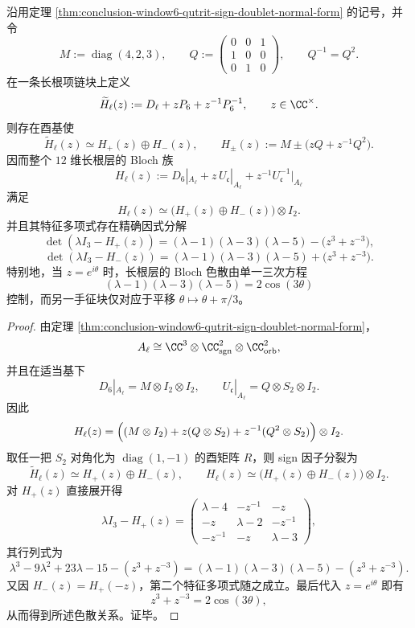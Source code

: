\begin{theorem}\label{thm:conclusion-window6-long-bloch-chiral-cubic}
沿用定理 \ref{thm:conclusion-window6-qutrit-sign-doublet-normal-form} 的记号，并令
\[
M:=\operatorname{diag}(4,2,3),\qquad
Q:=
\begin{pmatrix}
0&0&1\\
1&0&0\\
0&1&0
\end{pmatrix},
\qquad
Q^{-1}=Q^2.
\]
在一条长根项链块上定义
\[
\widetilde H_{\ell}(z):=D_{\ell}+zP_6+z^{-1}P_6^{-1},
\qquad z\in\CC^\times.
\]
则存在酉基使
\[
\widetilde H_{\ell}(z)\simeq H_+(z)\oplus H_-(z),
\qquad
H_\pm(z):=M\pm\bigl(zQ+z^{-1}Q^2\bigr).
\]
因而整个 \(12\) 维长根层的 Bloch 族
\[
H_{\ell}(z):=D_6|_{A_{\ell}}+z\,U_{\mathfrak c}|_{A_{\ell}}+z^{-1}U_{\mathfrak c}^{-1}|_{A_{\ell}}
\]
满足
\[
H_{\ell}(z)\simeq \bigl(H_+(z)\oplus H_-(z)\bigr)\otimes I_2.
\]
并且其特征多项式存在精确因式分解
\[
\det(\lambda I_3-H_+(z))
=(\lambda-1)(\lambda-3)(\lambda-5)-\bigl(z^3+z^{-3}\bigr),
\]
\[
\det(\lambda I_3-H_-(z))
=(\lambda-1)(\lambda-3)(\lambda-5)+\bigl(z^3+z^{-3}\bigr).
\]
特别地，当 \(z=e^{i\theta}\) 时，长根层的 Bloch 色散由单一三次方程
\[
(\lambda-1)(\lambda-3)(\lambda-5)=2\cos(3\theta)
\]
控制，而另一手征块仅对应于平移 \(\theta\mapsto \theta+\pi/3\)。
\end{theorem}
\begin{proof}
由定理 \ref{thm:conclusion-window6-qutrit-sign-doublet-normal-form}，
\[
A_{\ell}\cong \CC^3\otimes \CC^2_{\mathrm{sgn}}\otimes \CC^2_{\mathrm{orb}},
\]
并且在适当基下
\[
D_6|_{A_{\ell}}=M\otimes I_2\otimes I_2,
\qquad
U_{\mathfrak c}|_{A_{\ell}}=Q\otimes S_2\otimes I_2.
\]
因此
\[
H_{\ell}(z)
=\Bigl((M\otimes I_2)+z(Q\otimes S_2)+z^{-1}(Q^2\otimes S_2)\Bigr)\otimes I_2.
\]
取任一把 \(S_2\) 对角化为 \(\operatorname{diag}(1,-1)\) 的酉矩阵 \(R\)，则 sign 因子分裂为
\[
\widetilde H_{\ell}(z)\simeq H_+(z)\oplus H_-(z),
\qquad
H_{\ell}(z)\simeq \bigl(H_+(z)\oplus H_-(z)\bigr)\otimes I_2.
\]
对 \(H_+(z)\) 直接展开得
\[
\lambda I_3-H_+(z)=
\begin{pmatrix}
\lambda-4 & -z^{-1} & -z\\
-z & \lambda-2 & -z^{-1}\\
-z^{-1} & -z & \lambda-3
\end{pmatrix},
\]
其行列式为
\[
\lambda^3-9\lambda^2+23\lambda-15-(z^3+z^{-3})
=(\lambda-1)(\lambda-3)(\lambda-5)-(z^3+z^{-3}).
\]
又因 \(H_-(z)=H_+(-z)\)，第二个特征多项式随之成立。最后代入 \(z=e^{i\theta}\) 即有
\[
z^3+z^{-3}=2\cos(3\theta),
\]
从而得到所述色散关系。证毕。
\end{proof}

